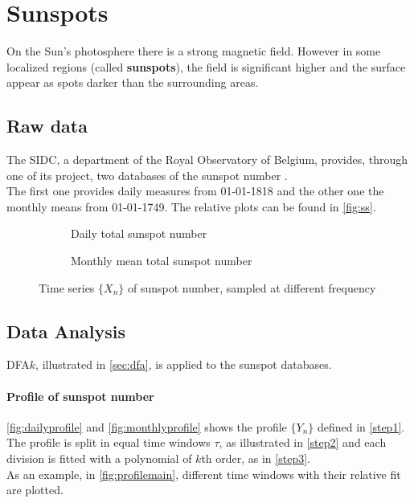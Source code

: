 \graphicspath{{../sunSpots/img/}}
\section{Sunspots}
On the Sun's photosphere there is a strong magnetic field. However in some localized regions (called \textbf{sunspots}), the field is significant higher and the surface appear as spots darker than the surrounding areas.

\subsection{Raw data}
The SIDC, a department of the Royal Observatory of Belgium, provides, through one of its project, two databases of the sunspot number \cite{sidc}. \\
The first one provides daily measures from 01-01-1818 and the other one the monthly means from 01-01-1749. The relative plots can be found in \autoref{fig:ss}.

\begin{figure}[!h]
	\centering
	\begin{subfigure}{0.48\textwidth}
		\centering
		
		\caption{Daily total sunspot number}\label{fig:dailyss}
	\end{subfigure}
	\hfill
	\begin{subfigure}{0.48\textwidth}
		\centering
		
		\caption{Monthly mean total sunspot number}\label{fig:monthlyss}
	\end{subfigure}
\caption{Time series $\{X_n\}$ of sunspot number, sampled at different frequency}\label{fig:ss}
\end{figure}

\subsection{Data Analysis}
DFA$k$, illustrated in \autoref{sec:dfa}, is applied to the sunspot databases. 

\paragraph{Profile of sunspot number}
\autoref{fig:dailyprofile} and \autoref{fig:monthlyprofile} shows the profile $\{Y_n\}$ defined in \autoref{step1}. \\
The profile is split in equal time windows $\tau$, as illustrated in \autoref{step2} and each division is fitted with a polynomial of $k$th order, as in \autoref{step3}.\\ 
As an example, in \autoref{fig:profilemain}, different time windows with their relative fit are plotted.

